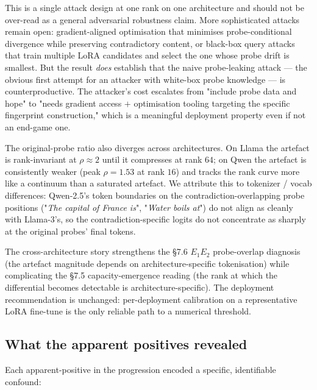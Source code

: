 \documentclass[11pt,a4paper]{article}
\begin{document}
This is a single attack design at one rank on one
architecture and should not be over\nobreakdash-read as a
general adversarial robustness claim.  More sophisticated
attacks remain open: gradient\nobreakdash-aligned
optimisation that minimises probe\nobreakdash-conditional
divergence while preserving contradictory content, or
black\nobreakdash-box query attacks that train multiple
LoRA candidates and select the one whose probe drift is
smallest.  But the result \emph{does} establish that the
naive probe\nobreakdash-leaking attack — the obvious first
attempt for an attacker with white\nobreakdash-box probe
knowledge — is counterproductive.  The attacker's cost
escalates from "include probe data and hope" to "needs
gradient access $+$ optimisation tooling targeting the
specific fingerprint construction," which is a meaningful
deployment property even if not an end\nobreakdash-game one.

The original\nobreakdash-probe ratio also diverges across
architectures.  On Llama the artefact is rank\nobreakdash-invariant
at $\rho \approx 2$ until it compresses at rank $64$; on Qwen
the artefact is consistently weaker (peak $\rho = 1.53$ at
rank $16$) and tracks the rank curve more like a continuum than
a saturated artefact.  We attribute this to tokenizer / vocab
differences: Qwen-2.5's token boundaries on the
contradiction\nobreakdash-overlapping probe positions
("\emph{The capital of France is}", "\emph{Water boils at}")
do not align as cleanly with Llama-3's, so the
contradiction\nobreakdash-specific logits do not concentrate
as sharply at the original probes' final tokens.

The cross\nobreakdash-architecture story strengthens the §7.6
$E_1$\textendash$E_2$ probe\nobreakdash-overlap diagnosis (the
artefact magnitude depends on architecture\nobreakdash-specific
tokenisation) while complicating the §7.5 capacity\nobreakdash-emergence
reading (the rank at which the differential becomes detectable
is architecture\nobreakdash-specific).  The deployment
recommendation is unchanged: per\nobreakdash-deployment
calibration on a representative LoRA fine\nobreakdash-tune is
the only reliable path to a numerical threshold.

\subsection{What the apparent positives revealed}
\label{sec:poisoning:lessons}

Each apparent\nobreakdash-positive in the progression encoded a
specific, identifiable confound:
\end{document}
